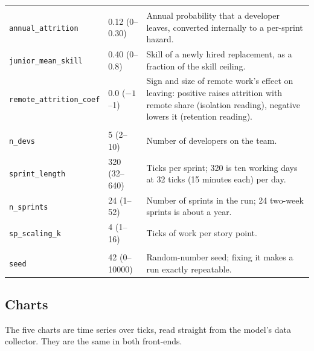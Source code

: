 \documentclass[11pt,a4paper]{article}
\begin{document}
\begin{center}
\begin{tabular}{llp{8.0cm}}
\addlinespace
\multicolumn{3}{l}{\textit{Turnover}}\\
\texttt{annual_attrition} & 0.12 (0--0.30) & Annual probability that a developer leaves, converted internally to a per-sprint hazard. \\
\texttt{junior_mean_skill} & 0.40 (0--0.8) & Skill of a newly hired replacement, as a fraction of the skill ceiling. \\
\texttt{remote_attrition_coef} & 0.0 ($-1$--1) & Sign and size of remote work's effect on leaving: positive raises attrition with remote share (isolation reading), negative lowers it (retention reading). \\
\addlinespace
\multicolumn{3}{l}{\textit{Structural}}\\
\texttt{n_devs} & 5 (2--10) & Number of developers on the team. \\
\texttt{sprint_length} & 320 (32--640) & Ticks per sprint; 320 is ten working days at 32 ticks (15 minutes each) per day. \\
\texttt{n_sprints} & 24 (1--52) & Number of sprints in the run; 24 two-week sprints is about a year. \\
\texttt{sp_scaling_k} & 4 (1--16) & Ticks of work per story point. \\
\addlinespace
\multicolumn{3}{l}{\textit{Reproducibility}}\\
\texttt{seed} & 42 (0--10000) & Random-number seed; fixing it makes a run exactly repeatable. \\
\bottomrule
\end{tabular}
\end{center}

\subsection*{Charts}

The five charts are time series over ticks, read straight from the model's data collector. They are
the same in both front-ends.
\end{document}

